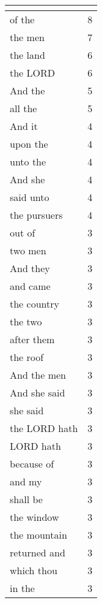 \begin{center}
\begin{longtable}{|p{3.0in}|p{0.5in}|}
\hline \multicolumn{2}{c}{{ }} \\ \hline
\endfoot 
of the & 8\\ \hline 
the men & 7\\ \hline 
the land & 6\\ \hline 
the LORD & 6\\ \hline 
And the & 5\\ \hline 
all the & 5\\ \hline 
And it & 4\\ \hline 
upon the & 4\\ \hline 
unto the & 4\\ \hline 
And she & 4\\ \hline 
said unto & 4\\ \hline 
the pursuers & 4\\ \hline 
out of & 3\\ \hline 
two men & 3\\ \hline 
And they & 3\\ \hline 
and came & 3\\ \hline 
the country & 3\\ \hline 
the two & 3\\ \hline 
after them & 3\\ \hline 
the roof & 3\\ \hline 
And the men & 3\\ \hline 
And she said & 3\\ \hline 
she said & 3\\ \hline 
the LORD hath & 3\\ \hline 
LORD hath & 3\\ \hline 
because of & 3\\ \hline 
and my & 3\\ \hline 
shall be & 3\\ \hline 
the window & 3\\ \hline 
the mountain & 3\\ \hline 
returned and & 3\\ \hline 
which thou & 3\\ \hline 
in the & 3\\ \hline 
\end{longtable}
\end{center}





